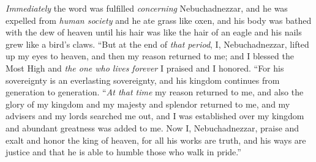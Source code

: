 \begin{biblechapter}
\verse \textit{Immediately} the word was fulfilled \textit{concerning} Nebuchadnezzar, and he was expelled from \textit{human society} and he ate grass like oxen, and his body was bathed with the dew of heaven until his hair was like the hair of an eagle and his nails grew like a bird’s claws.
 “But at the end of \textit{that period}, I, Nebuchadnezzar, lifted up my eyes to heaven, and then my reason returned to me; and I blessed the Most High and \textit{the one who lives forever} I praised and I honored.
\verse “For his sovereignty is an everlasting sovereignty, 
and his kingdom continues from generation to generation.
\verse “\textit{At that time} my reason returned to me, and also the glory of my kingdom and my majesty and splendor returned to me, and my advisers and my lords searched me out, and I was established over my kingdom and abundant greatness was added to me.
\verse Now I, Nebuchadnezzar, praise and exalt and honor the king of heaven, for all his works are truth, and his ways are justice and that he is able to humble those who walk in pride.”
\end{biblechapter}

